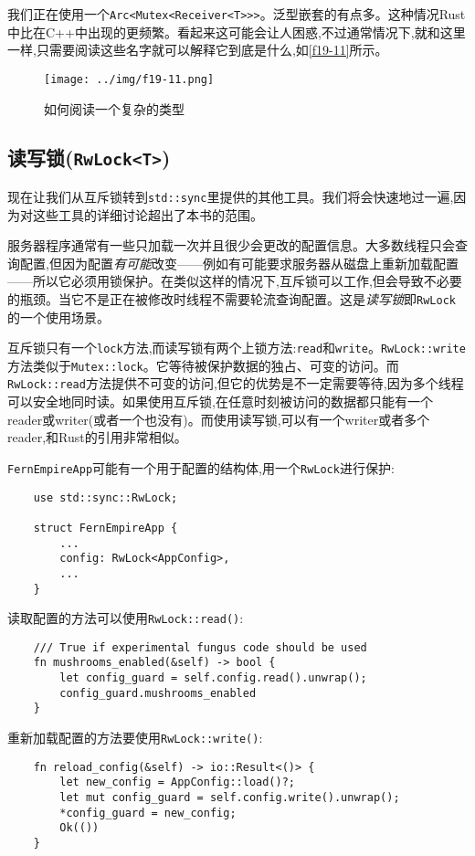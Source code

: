 我们正在使用一个\texttt{Arc<Mutex<Receiver<T>>>}。泛型嵌套的有点多。这种情况Rust中比在C++中出现的更频繁。看起来这可能会让人困惑,不过通常情况下,就和这里一样,只需要阅读这些名字就可以解释它到底是什么,如\autoref{f19-11}所示。

\begin{figure}[htbp]
    \centering
    \texttt{[image: ../img/f19-11.png]}
    \caption{如何阅读一个复杂的类型}
    \label{f19-11}
\end{figure}

\subsection{读写锁(\texttt{RwLock<T>})}
现在让我们从互斥锁转到\texttt{std::sync}里提供的其他工具。我们将会快速地过一遍,因为对这些工具的详细讨论超出了本书的范围。

服务器程序通常有一些只加载一次并且很少会更改的配置信息。大多数线程只会查询配置,但因为配置\emph{有可能}改变——例如有可能要求服务器从磁盘上重新加载配置——所以它必须用锁保护。在类似这样的情况下,互斥锁可以工作,但会导致不必要的瓶颈。当它不是正在被修改时线程不需要轮流查询配置。这是\emph{读写锁}即\texttt{RwLock}的一个使用场景。

互斥锁只有一个\texttt{lock}方法,而读写锁有两个上锁方法:\texttt{read}和\texttt{write}。\texttt{RwLock::write}方法类似于\texttt{Mutex::lock}。它等待被保护数据的独占、可变的访问。而\texttt{RwLock::read}方法提供不可变的访问,但它的优势是不一定需要等待,因为多个线程可以安全地同时读。如果使用互斥锁,在任意时刻被访问的数据都只能有一个reader或writer(或者一个也没有)。而使用读写锁,可以有一个writer或者多个reader,和Rust的引用非常相似。

\texttt{FernEmpireApp}可能有一个用于配置的结构体,用一个\texttt{RwLock}进行保护:
\begin{verbatim}
    use std::sync::RwLock;

    struct FernEmpireApp {
        ...
        config: RwLock<AppConfig>,
        ...
    }
\end{verbatim}

读取配置的方法可以使用\texttt{RwLock::read()}:
\begin{verbatim}
    /// True if experimental fungus code should be used 
    fn mushrooms_enabled(&self) -> bool {
        let config_guard = self.config.read().unwrap();
        config_guard.mushrooms_enabled
    }
\end{verbatim}

重新加载配置的方法要使用\texttt{RwLock::write()}:
\begin{verbatim}
    fn reload_config(&self) -> io::Result<()> {
        let new_config = AppConfig::load()?;
        let mut config_guard = self.config.write().unwrap();
        *config_guard = new_config;
        Ok(())
    }
\end{verbatim}

